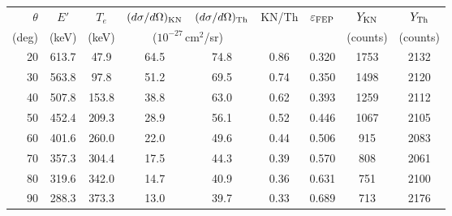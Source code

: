 \begin{tabular}{rcccccccc}
\hline\hline
$\theta$ & $E'$ & $T_e$ & $(d\sigma/d\Omega)_{\rm KN}$ & $(d\sigma/d\Omega)_{\rm Th}$ & KN/Th & $\varepsilon_{\rm FEP}$ & $Y_{\rm KN}$ & $Y_{\rm Th}$\\
(deg) & (keV) & (keV) & \multicolumn{2}{c}{($10^{-27}$\,cm$^2$/sr)} & & & (counts) & (counts)\\
\hline
20 & 613.7 & 47.9 & 64.5 & 74.8 & 0.86 & 0.320 & 1753 & 2132\\
30 & 563.8 & 97.8 & 51.2 & 69.5 & 0.74 & 0.350 & 1498 & 2120\\
40 & 507.8 & 153.8 & 38.8 & 63.0 & 0.62 & 0.393 & 1259 & 2112\\
50 & 452.4 & 209.3 & 28.9 & 56.1 & 0.52 & 0.446 & 1067 & 2105\\
60 & 401.6 & 260.0 & 22.0 & 49.6 & 0.44 & 0.506 & 915 & 2083\\
70 & 357.3 & 304.4 & 17.5 & 44.3 & 0.39 & 0.570 & 808 & 2061\\
80 & 319.6 & 342.0 & 14.7 & 40.9 & 0.36 & 0.631 & 751 & 2100\\
90 & 288.3 & 373.3 & 13.0 & 39.7 & 0.33 & 0.689 & 713 & 2176\\
\hline\hline
\end{tabular}
